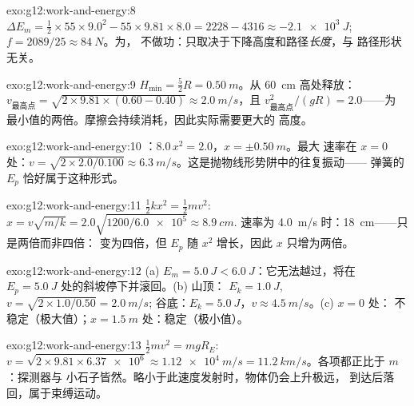 \begin{solution}{exo:g12:work-and-energy:8}
$\Delta E_m = \tfrac12 \times 55 \times 9.0^2 - 55 \times 9.81 \times
8.0 = 2228 - 4316 \approx \qty{-2.1e3}{J}$;
$f = 2089/25 \approx \qty{84}{N}$。为，
不做功：只取决于下降高度和路径\emph{长度}，与
路径形状无关。
\end{solution}

\begin{solution}{exo:g12:work-and-energy:9}
$H_{\min} = \tfrac52 R = \qty{0.50}{m}$。从 \qty{60}{cm} 高处释放：
$v_{\text{最高点}} = \sqrt{2 \times 9.81 \times (0.60 - 0.40)} \approx
\qty{2.0}{m/s}$，且 $v_{\text{最高点}}^2/(gR) = 2.0$——为
最小值的两倍。摩擦会持续消耗，因此实际需要更大的
高度。
\end{solution}

\begin{solution}{exo:g12:work-and-energy:10}
：$8.0\,x^2 = 2.0$，$x = \pm\qty{0.50}{m}$。最大
速率在 $x = 0$ 处：$v = \sqrt{2 \times 2.0/0.100} \approx
\qty{6.3}{m/s}$。这是抛物线形势阱中的往复振动——
弹簧的 $E_p$ 恰好属于这种形式。
\end{solution}

\begin{solution}{exo:g12:work-and-energy:11}
$\tfrac12 kx^2 = \tfrac12 mv^2$:
$x = v\sqrt{m/k} = 2.0\sqrt{1200/\num{6.0e5}} \approx \qty{8.9}{cm}$.
速率为 \qty{4.0}{m/s} 时：\qty{18}{cm}——只是两倍而非四倍：
变为四倍，但 $E_p$ 随 $x^2$ 增长，因此 $x$ 只增为两倍。
\end{solution}

\begin{solution}{exo:g12:work-and-energy:12}
(a) $E_m = \qty{5.0}{J} < \qty{6.0}{J}$：它无法越过，将在
$E_p = \qty{5.0}{J}$ 处的斜坡停下并滚回。(b) 山顶：
$E_k = \qty{1.0}{J}$, $v = \sqrt{2 \times 1.0/0.50} = \qty{2.0}{m/s}$;
谷底：$E_k = \qty{5.0}{J}$，$v \approx \qty{4.5}{m/s}$。(c) $x = 0$ 处：
不稳定（极大值）；$x = \qty{1.5}{m}$ 处：稳定（极小值）。
\end{solution}

\begin{solution}{exo:g12:work-and-energy:13}
$\tfrac12 mv^2 = mgR_E$:
$v = \sqrt{2 \times 9.81 \times \num{6.37e6}} \approx \qty{1.12e4}{m/s}
= \qty{11.2}{km/s}$。各项都正比于 $m$：探测器与
小石子皆然。略小于此速度发射时，物体仍会上升极远，
到达后落回，属于束缚运动。
\end{solution}

